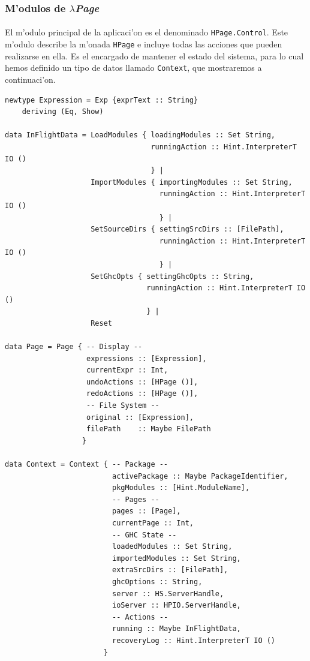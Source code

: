 \documentclass[a4paper]{article}
\newcommand{\hpage}{\textbf{\textsl{$\lambda$Page}}}
\begin{document}
\subsubsection{M'odulos de \hpage}
\paragraph{}El m'odulo principal de la aplicaci'on es el denominado \texttt{HPage.Control}.  Este m'odulo describe la m'onada \texttt{HPage} e incluye todas las acciones que pueden realizarse en ella.  Es el encargado de mantener el estado del sistema, para lo cual hemos definido un tipo de datos llamado \texttt{Context}, que mostraremos a continuaci'on.
\begin{center}\begin{lstlisting}
newtype Expression = Exp {exprText :: String}       
    deriving (Eq, Show)

data InFlightData = LoadModules { loadingModules :: Set String,
                                  runningAction :: Hint.InterpreterT IO ()
                                  } |
                    ImportModules { importingModules :: Set String,
                                    runningAction :: Hint.InterpreterT IO ()
                                    } | 
                    SetSourceDirs { settingSrcDirs :: [FilePath],
                                    runningAction :: Hint.InterpreterT IO ()
                                    } |
                    SetGhcOpts { settingGhcOpts :: String,
                                 runningAction :: Hint.InterpreterT IO ()
                                 } |
                    Reset

data Page = Page { -- Display --
                   expressions :: [Expression],
                   currentExpr :: Int,
                   undoActions :: [HPage ()],
                   redoActions :: [HPage ()],
                   -- File System --
                   original :: [Expression],
                   filePath    :: Maybe FilePath
                  }
                  
data Context = Context { -- Package --
                         activePackage :: Maybe PackageIdentifier,
                         pkgModules :: [Hint.ModuleName],
                         -- Pages --
                         pages :: [Page],
                         currentPage :: Int,
                         -- GHC State --
                         loadedModules :: Set String,
                         importedModules :: Set String,
                         extraSrcDirs :: [FilePath],
                         ghcOptions :: String,
                         server :: HS.ServerHandle,
                         ioServer :: HPIO.ServerHandle,
                         -- Actions --
                         running :: Maybe InFlightData,
                         recoveryLog :: Hint.InterpreterT IO ()
                       }
\end{lstlisting}\end{center}
\end{document}
